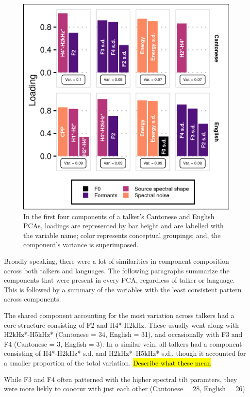 \begin{figure}[htbp]
\begin{center}
\includegraphics[width=0.875\linewidth]{figures/3-VF32A_pretty.png} 
\caption{In the first four components of a talker's Cantonese and English PCAs, loadings are represented by bar height and are labelled with the variable name; color represents conceptual groupings; and, the component's variance is superimposed.}
\label{ch3:fig:VF32A}
\end{center}
\end{figure}

Broadly speaking, there were a lot of similarities in component composition across both talkers and languages. The following paragraphs summarize the components that were present in every PCA, regardless of talker or language. This is followed by a summary of the variables with the least consistent pattern across components. 

The shared component accounting for the most variation across talkers had a core structure consisting of F2 and H4*-H2kHz. These usually went along with H2kHz*-H5kHz* (Cantonese = 34, English = 31), and occasionally with F3 and F4 (Cantonese = 3, English = 3). In a similar vein, all talkers had a component consisting of H4*-H2kHz* s.d. and H2kHz*--H5kHz* s.d., though it accounted for a smaller proportion of the total variation. \hl{Describe what these mean}

While F3 and F4 often patterned with the higher spectral tilt paramters, they were more liekly to cooccur with just each other (Cantonese = 28, English = 26)

